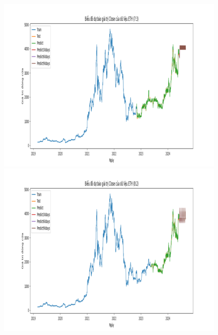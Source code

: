 \documentclass[conference]{IEEEtran}
\begin{document}
\begin{figure}[H]
    \centering
    \begin{minipage}{0.15\textwidth}
    \centering
    \includegraphics[width=1\textwidth]{Figure/RandomForest_ETH_73.png}
    \end{minipage}
    \hfill
    \begin{minipage}{0.15\textwidth}
    \centering
    \includegraphics[width=1\textwidth]{Figure/RandomForest_ETH_82.png}
    \end{minipage}
    \hfill
    \begin{minipage}{0.15\textwidth}
    \centering

\end{minipage}
\end{figure}
\end{document}

